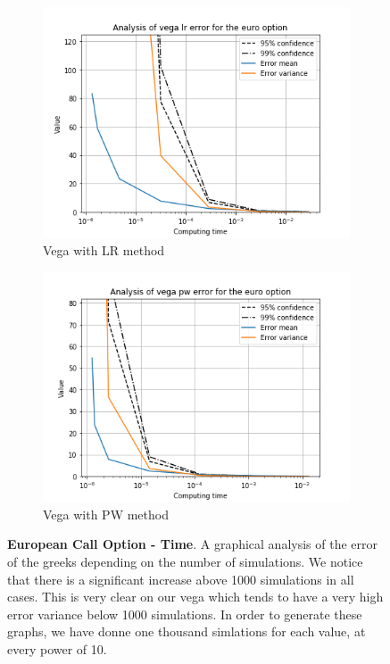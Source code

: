 \documentclass[11pt,a4paper,fleqn]{article}
\begin{document}
\begin{figure}[h!]
      \begin{subfigure}[b]{0.45\textwidth}
          \includegraphics[width=\textwidth]{graphs/eurovegalrtime.png}
          \caption{Vega with LR method}
      \end{subfigure}
      \begin{subfigure}[b]{0.45\textwidth}
          \includegraphics[width=\textwidth]{graphs/eurovegapwtime.png}
          \caption{Vega with PW method}
      \end{subfigure}

      \caption{\textbf{European Call Option - Time}. A graphical analysis of the error of the greeks depending on the number of simulations. We notice that there is a significant increase above 1000 simulations in all cases. This is very clear on our vega which tends to have a very high error variance below 1000 simulations. In order to generate these graphs, we have donne one thousand simlations for each value, at every power of 10.}
\end{figure}
\end{document}
